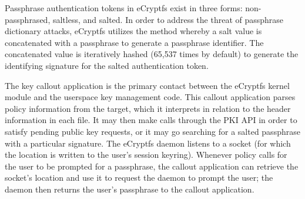 Passphrase authentication tokens in eCryptfs exist in three forms: non-passphrased, saltless, and salted. In order to address the threat of passphrase dictionary attacks, eCryptfs utilizes the method whereby a salt value is concatenated with a passphrase to generate a passphrase identifier. The concatenated value is iteratively hashed (65,537 times by default) to generate the identifying signature for the salted authentication token.

The key callout application is the primary contact between the eCryptfs kernel module and the userspace key management code. This callout application parses policy information from the target, which it interprets in relation to the header information in each file. It may then make calls through the PKI API in order to satisfy pending public key requests, or it may go searching for a salted passphrase with a particular signature. The eCryptfs daemon listens to a socket (for which the location is written to the user’s session keyring). Whenever policy calls for the user to be prompted for a passphrase, the callout application can retrieve the socket’s location and use it to request the daemon to prompt the user; the daemon then returns the user’s passphrase to the callout application.

